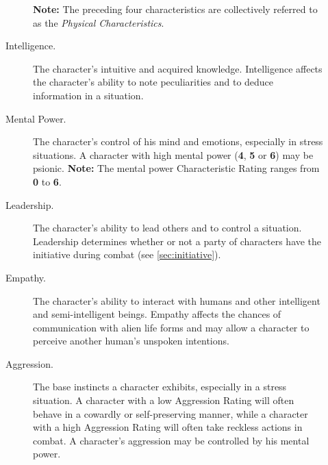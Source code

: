 \begin{description}
\begin{description}
    \textbf{Note:} The preceding four characteristics are collectively
    referred to as the \emph{Physical Characteristics}.
  \item[\index{characteristics!intelligence|see{intelligence}}Intelligence.] The character's intuitive and acquired
    knowledge. Intelligence affects the character's ability to note
    peculiarities and to deduce information in a situation.
  \item[\index{characteristics!mental power|see{mental power}}Mental Power.] The character's control of his mind and
    emotions, especially in stress situations.  A character with high
    mental power (\textbf{4}, \textbf{5} or \textbf{6}) may be
    psionic.  \textbf{Note:} The mental power Characteristic Rating
    ranges from \textbf{0} to \textbf{6}.
  \item[\index{characteristics!leadership|see{leadership}}Leadership.] The character's ability to lead others and to
    control a situation. Leadership determines whether or not a party
    of characters have the initiative during combat (see
    \ref{sec:initiative}).
  \item[\index{characteristics!empathy|see{empathy}}Empathy.] The character's ability to interact with humans and
    other intelligent and semi-intelligent beings. Empathy affects the
    chances of communication with alien life forms and may allow a
    character to perceive another human's unspoken intentions.
  \item[\index{characteristics!aggression|see{aggression}}Aggression.] The base instincts a character exhibits,
    especially in a stress situation. A character with a low
    Aggression Rating will often behave in a cowardly or
    self-preserving manner, while a character with a high Aggression
    Rating will often take reckless actions in combat. A character's
    aggression may be controlled by his mental power.
  \end{description}
  

\end{description}
